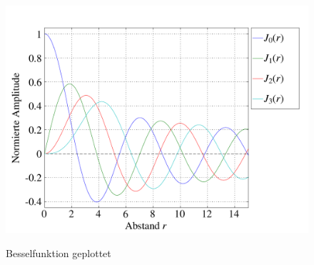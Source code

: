\begin{figure}
	\begin{center}
		\includegraphics[scale=0.5]{kreis/besselfunction.pdf}
		\label{img:besselfunction}
		\caption[Besselfunktion]{Besselfunktion geplottet}
	\end{center}
\end{figure}

%
